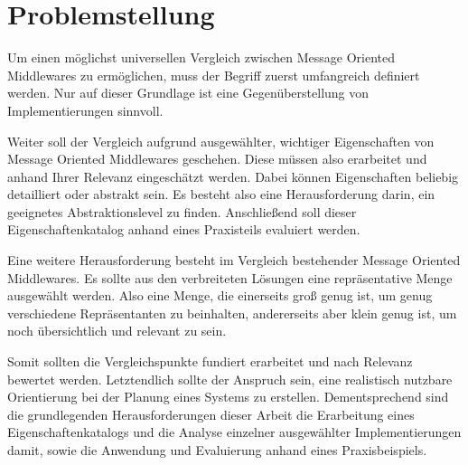 \section{Problemstellung}
\label{intro:problem}
Um einen möglichst universellen Vergleich zwischen Message Oriented Mid\-dlewares
zu ermöglichen, muss der Begriff zuerst umfangreich definiert werden.
Nur auf dieser Grundlage ist eine Gegenüberstellung von Implementierungen sinnvoll.

Weiter soll der Vergleich aufgrund ausgewählter, wichtiger Eigenschaften
von Message Oriented Middlewares geschehen.
Diese müssen also erarbeitet und anhand Ihrer Relevanz eingeschätzt werden.
Dabei können Eigenschaften beliebig detailliert oder abstrakt sein.
Es besteht also eine Herausforderung da\-rin, ein geeignetes Abstraktionslevel zu
finden. Anschließend soll dieser Eigenschaftenkatalog anhand eines Praxisteils
evaluiert werden.

Eine weitere Herausforderung besteht im Vergleich bestehender Message Oriented
Middlewares. Es sollte aus den verbreiteten Lösungen eine repräsentative Menge
ausgewählt werden. Also eine Menge, die einerseits groß genug ist, um genug
verschiedene Repräsentanten zu beinhalten, andererseits aber klein genug ist,
um noch übersichtlich und relevant zu sein. 

Somit sollten die Vergleichspunkte fundiert erarbeitet und nach Relevanz
bewertet werden. Letztendlich sollte der Anspruch sein, eine realistisch nutzbare
Orientierung bei der Planung eines Systems zu erstellen.
Dementsprechend sind die grundlegenden Herausforderungen dieser Arbeit die
Erarbeitung eines Eigenschaftenkatalogs und die Analyse einzelner ausgewählter
Implementierungen damit, sowie die Anwendung und Evaluierung anhand eines
Praxisbeispiels.

